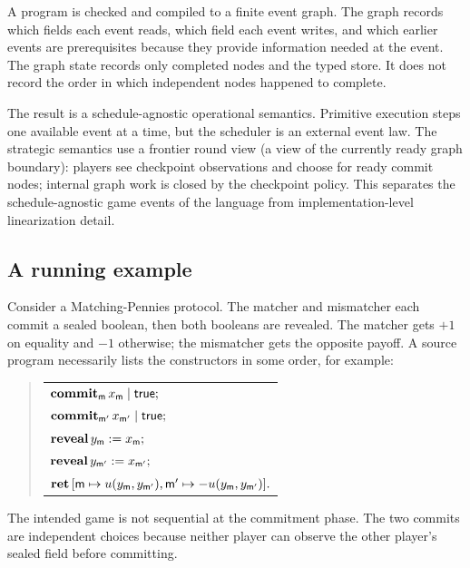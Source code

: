 A program is checked and compiled to a finite event graph.  The graph records which
fields each event reads, which field each event writes, and which earlier
events are prerequisites because they provide information needed at the
event.  The graph state records only completed nodes and the typed store.
It does not record the order in which independent nodes happened to
complete.

The result is a schedule-agnostic operational semantics.  Primitive
execution steps one available event at a time, but the scheduler is an
external event law.  The strategic semantics use a frontier round view
(a view of the currently ready graph boundary): players see checkpoint
observations and choose for ready commit nodes; internal graph work is
closed by the checkpoint policy.  This separates the schedule-agnostic
game events of the language from implementation-level linearization
detail.

\subsection{A running example}
\label{sec:intro:matching-pennies}

Consider a Matching-Pennies protocol.  The matcher and mismatcher each
commit a sealed boolean, then both booleans are revealed.  The matcher
gets \(+1\) on equality and \(-1\) otherwise; the mismatcher gets the
opposite payoff.  A source program necessarily lists the constructors in
some order, for example:
\begin{quote}\small
\begin{tabular}{@{}l@{}}
\(\mathbf{commit}_{\mathsf{m}}\,x_{\mathsf{m}} \mid \mathsf{true};\)\\
\(\mathbf{commit}_{\mathsf{m'}}\,x_{\mathsf{m'}} \mid \mathsf{true};\)\\
\(\mathbf{reveal}\,y_{\mathsf{m}} := x_{\mathsf{m}};\)\\
\(\mathbf{reveal}\,y_{\mathsf{m'}} := x_{\mathsf{m'}};\)\\
\(\mathbf{ret}\,[\mathsf{m}\mapsto u(y_{\mathsf{m}},y_{\mathsf{m'}}),
          \mathsf{m'}\mapsto -u(y_{\mathsf{m}},y_{\mathsf{m'}})].\)
\end{tabular}
\end{quote}
The intended game is not sequential at the commitment phase.  The two
commits are independent choices because neither player can observe the
other player's sealed field before committing.

